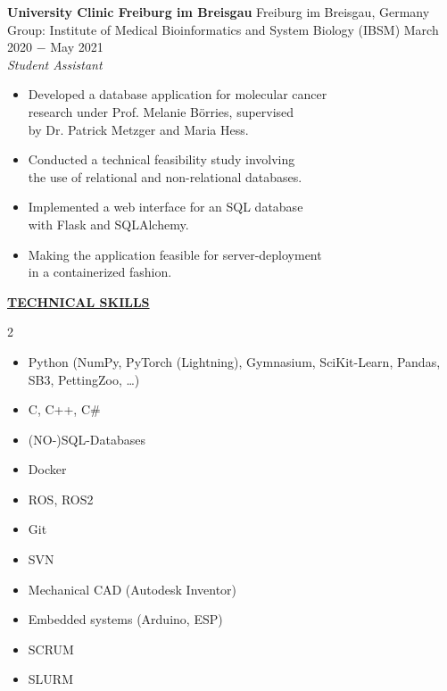 \documentclass{article}
\begin{document}
\noindent \textbf{University Clinic Freiburg im Breisgau}  \hfill Freiburg im Breisgau, Germany \\
\noindent Group: Institute of Medical Bioinformatics and System Biology (IBSM)  \hfill March 2020 $-$ May 2021 \\
\textit{Student Assistant}
\begin{itemize}[noitemsep,nolistsep,leftmargin=*]
    \item Developed a database application for molecular cancer \\
    research under Prof. Melanie Börries, supervised \\
    by Dr. Patrick Metzger and Maria Hess.
    \item Conducted a technical feasibility study involving \\
    the use of relational and non-relational databases.
    \item Implemented a web interface for an SQL database \\
    with Flask and SQLAlchemy. 
    \item Making the application feasible for server-deployment\\
    in a containerized fashion.\\
\end{itemize}



\noindent \textbf{\underline{TECHNICAL SKILLS}}
\begin{multicols}{2}
\begin{itemize}
    \item Python (NumPy, PyTorch (Lightning), Gymnasium, SciKit-Learn, Pandas, SB3, PettingZoo, \ldots)
    \item C, C++, C\#
    \item (NO-)SQL-Databases
    \item Docker
    \item ROS, ROS2
    \item Git
    \item SVN
    \item Mechanical CAD (Autodesk Inventor)
    \item Embedded systems (Arduino, ESP)
    \item SCRUM
    \item SLURM
\end{itemize}
\end{multicols}
\vspace{0.4cm}
\end{document}
